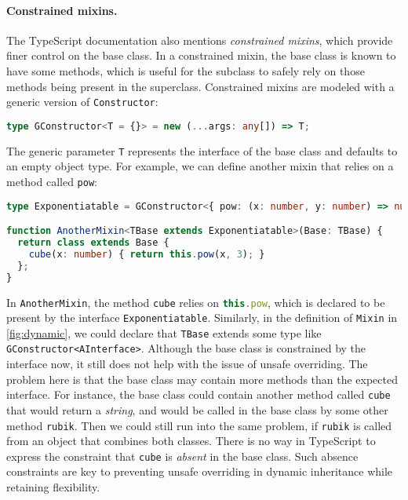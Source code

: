 \paragraph{Constrained mixins.}
The TypeScript documentation also mentions \emph{constrained mixins}, which
provide finer control on the base class. In a constrained mixin, the base class
is known to have some methods, which is useful for the subclass to safely rely
on those methods being present in the superclass. Constrained mixins are modeled
with a generic version of \lstinline{Constructor}:
\begin{lstlisting}[language=TypeScript]
type GConstructor<T = {}> = new (...args: any[]) => T;
\end{lstlisting}
The generic parameter \lstinline{T} represents the interface of the base class
and defaults to an empty object type. For example, we can define another mixin
that relies on a method called \lstinline{pow}:
\begin{lstlisting}[language=TypeScript]
type Exponentiatable = GConstructor<{ pow: (x: number, y: number) => number }>;

function AnotherMixin<TBase extends Exponentiatable>(Base: TBase) {
  return class extends Base {
    cube(x: number) { return this.pow(x, 3); }
  };
}
\end{lstlisting}
In \lstinline{AnotherMixin}, the method \lstinline{cube} relies on
\lstinline[language=TypeScript]{this.pow}, which is declared to be present by
the interface \lstinline{Exponentiatable}. Similarly, in the definition of
\lstinline{Mixin} in \autoref{fig:dynamic}, we could declare that
\lstinline{TBase} extends some type like \lstinline|GConstructor<AInterface>|.
Although the base class is constrained by the interface now, it still does not
help with the issue of unsafe overriding. The problem here is that the base
class may contain more methods than the expected interface. For instance, the
base class could contain another method called \lstinline{cube} that would
return a \emph{string}, and would be called in the base class by some other
method \lstinline{rubik}. Then we could still run into the same problem, if
\lstinline{rubik} is called from an object that combines both classes. There is
no way in TypeScript to express the constraint that \lstinline{cube} is
\emph{absent} in the base class. Such absence constraints are key to preventing
unsafe overriding in dynamic inheritance while retaining flexibility.

